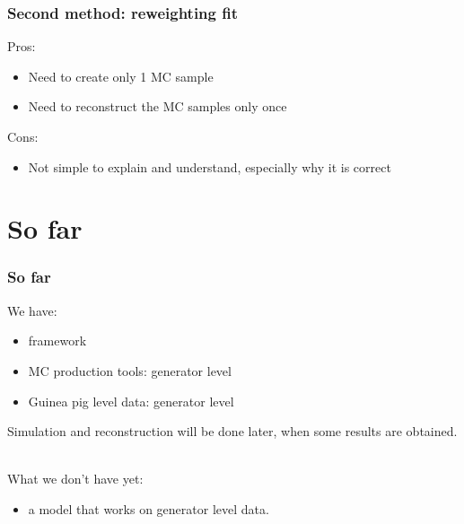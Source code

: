 \documentclass{beamer}
\begin{document}
\begin{frame}
\frametitle{Second method: reweighting fit}
Pros:
\begin{itemize}
\item Need to create only 1 MC sample
\item Need to reconstruct the MC samples only once
\end{itemize}
Cons:
\begin{itemize}
\item Not simple to explain and understand, especially why it is correct
\end{itemize}
\end{frame}
\section{So far}
\begin{frame}
\frametitle{So far}
We have:
\begin{itemize}
\item framework
\item MC production tools: generator level
\item Guinea pig level data: generator level
\end{itemize}
Simulation and reconstruction will be done later, when some results are obtained. 

~\\

What we don't have yet:
\begin{itemize}
\item a model that works on generator level data.
\end{itemize}
\end{frame}
\end{document}
